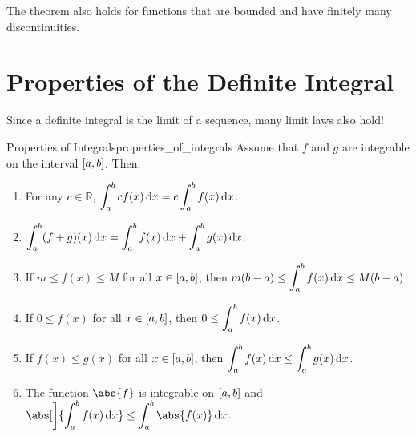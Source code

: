 \begin{Remark}{}{}
    The theorem also holds for functions that are bounded and have finitely many
    discontinuities.
\end{Remark}

\section{Properties of the Definite Integral}

Since a definite integral is the limit of a sequence, many limit laws also hold!

\begin{Theorem}{Properties of Integrals}{properties_of_integrals}
    Assume that $ f $ and $ g $ are integrable on the interval $ \interval{a}{b} $. Then:
    \begin{enumerate}[label=(\arabic*)]
        \item\label{property_integral_1} For any $ c\in\mathbb{R} $,
              $ \displaystyle\int_{a}^{b} cf(x)\odif{x} = c \int_{a}^{b} f(x)\odif{x} $.
        \item\label{property_integral_2}
              $ \displaystyle \int_{a}^{b} (f+g)(x)\odif{x} = \int_{a}^{b} f(x)\odif{x} +
                  \int_{a}^{b} g(x)\odif{x} $.
        \item\label{property_integral_3} If $ m\le f(x)\le M $ for all $ x\in\interval{a}{b} $,
              then
              $ \displaystyle m(b-a)\le \int_{a}^{b} f(x)\odif{x} \le M(b-a) $.
        \item\label{property_integral_4} If $ 0\le f(x) $ for all $ x\in\interval{a}{b} $, then
              $ \displaystyle 0\le \int_{a}^{b} f(x)\odif{x} $.
        \item\label{property_integral_5} If $ f(x)\le g(x) $ for all $ x\in\interval{a}{b} $, then
              $ \displaystyle \int_{a}^{b} f(x)\odif{x} \le \int_{a}^{b} g(x)\odif{x} $.
        \item\label{property_integral_6} The function
              $ \abs{f} $ is integrable on $ \interval{a}{b} $ and
              $ \displaystyle \abs[\bigg]{\int_{a}^{b} f(x)\odif{x}}
                  \le \int_{a}^{b} \abs{f(x)}\odif{x} $.
    \end{enumerate}
\end{Theorem}


